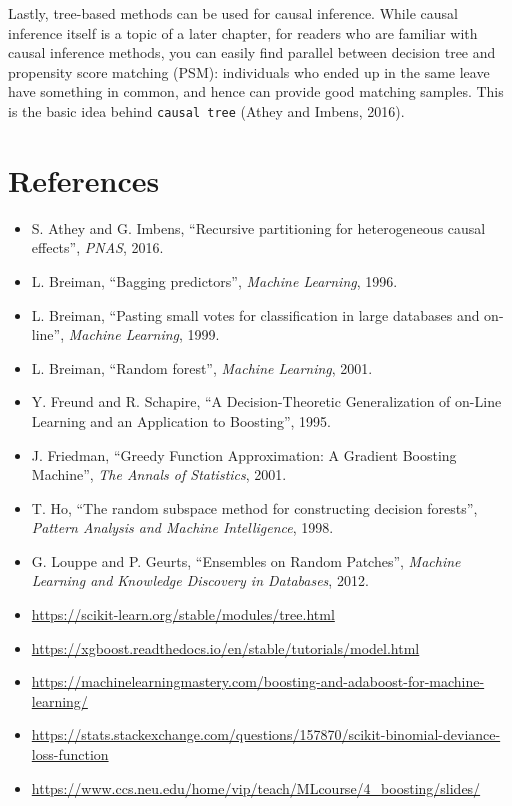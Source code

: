 \documentclass[
]{book}
\providecommand{\tightlist}{%
  \setlength{\itemsep}{0pt}\setlength{\parskip}{0pt}}
\theoremstyle{definition}
\theoremstyle{definition}
\theoremstyle{definition}
\theoremstyle{definition}
\theoremstyle{remark}
\begin{document}
Lastly, tree-based methods can be used for causal inference. While causal inference itself is a topic of a later chapter, for readers who are familiar with causal inference methods, you can easily find parallel between decision tree and propensity score matching (PSM): individuals who ended up in the same leave have something in common, and hence can provide good matching samples. This is the basic idea behind \texttt{causal\ tree} (Athey and Imbens, 2016).

\hypertarget{references-1}{%
\section{References}\label{references-1}}

\begin{itemize}
\tightlist
\item
  S. Athey and G. Imbens, ``Recursive partitioning for heterogeneous causal effects'', \emph{PNAS}, 2016.
\item
  L. Breiman, ``Bagging predictors'', \emph{Machine Learning}, 1996.
\item
  L. Breiman, ``Pasting small votes for classification in large databases and on-line'', \emph{Machine Learning}, 1999.
\item
  L. Breiman, ``Random forest'', \emph{Machine Learning}, 2001.
\item
  Y. Freund and R. Schapire, ``A Decision-Theoretic Generalization of on-Line Learning and an Application to Boosting'', 1995.
\item
  J. Friedman, ``Greedy Function Approximation: A Gradient Boosting Machine'', \emph{The Annals of Statistics}, 2001.
\item
  T. Ho, ``The random subspace method for constructing decision forests'', \emph{Pattern Analysis and Machine Intelligence}, 1998.
\item
  G. Louppe and P. Geurts, ``Ensembles on Random Patches'', \emph{Machine Learning and Knowledge Discovery in Databases}, 2012.
\item
  \url{https://scikit-learn.org/stable/modules/tree.html}
\item
  \url{https://xgboost.readthedocs.io/en/stable/tutorials/model.html}
\item
  \url{https://machinelearningmastery.com/boosting-and-adaboost-for-machine-learning/}
\item
  \url{https://stats.stackexchange.com/questions/157870/scikit-binomial-deviance-loss-function}
\item
  \url{https://www.ccs.neu.edu/home/vip/teach/MLcourse/4_boosting/slides/}
\end{itemize}
\end{document}
